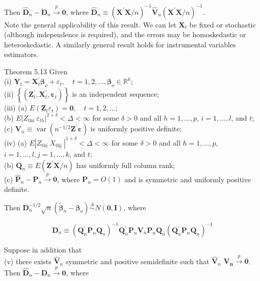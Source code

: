 \documentclass[10pt]{article}
\begin{document}
Then $\hat{\mathbf{D}}_{n}-\mathbf{D}_{n} \xrightarrow{p} \mathbf{0}$, where $\hat{\mathbf{D}}_{n} \equiv\left(\mathbf{X}^{\prime} \mathbf{X} / n\right)^{-1} \hat{\mathbf{V}}_{n}\left(\mathbf{X}^{\prime} \mathbf{X} / n\right)^{-1}$.\\
Note the general applicability of this result. We can let $\mathbf{X}_{t}$ be fixed or stochastic (although independence is required), and the errors may be homoskedastic or heteroskedastic. A similarly general result holds for instrumental variables estimators.

Theorem 5.13 Given\\
(i) $\mathbf{Y}_{t}=\mathbf{X}_{t}^{\prime} \boldsymbol{\beta}_{o}+\varepsilon_{t}, \quad t=1,2, \ldots, \boldsymbol{\beta}_{o} \in \mathbb{R}^{k}$;\\
(ii) $\left\{\left(\mathbf{Z}_{t}^{\prime}, \mathbf{X}_{t}^{\prime}, \boldsymbol{\varepsilon}_{t}\right)\right\}$ is an independent sequence;\\
(iii) (a) $E\left(\mathbf{Z}_{t} \varepsilon_{t}\right)=\mathbf{0}, \quad t=1,2, \ldots$;\\
(b) $E\left|Z_{\text {thi }} \varepsilon_{t h}\right|^{2+\delta}<\Delta<\infty$ for some $\delta>0$ and all $h=1, \ldots, p$, $i=1, \ldots, l$, and $t$;\\
(c) $\mathbf{V}_{n} \equiv \operatorname{var}\left(n^{-1 / 2} \mathbf{Z}^{\prime} \boldsymbol{\varepsilon}\right)$ is uniformly positive definite;\\
(iv) (a) $E\left|Z_{\text {thi }} X_{\text {thj }}\right|^{1+\delta}<\Delta<\infty$ for some $\delta>0$ and all $h=1, \ldots, p$, $i=1, \ldots, l, j=1, \ldots, k$, and $t$;\\
(b) $\mathbf{Q}_{n} \equiv E\left(\mathbf{Z}^{\prime} \mathbf{X} / n\right)$ has uniformly full column rank;\\
(c) $\hat{\mathbf{P}}_{n}-\mathbf{P}_{n} \xrightarrow{p} \mathbf{0}$, where $\mathbf{P}_{n}=O(1)$ and is symmetric and uniformly positive definite.

Then $\mathbf{D}_{n}^{-1 / 2} \sqrt{n}\left(\tilde{\boldsymbol{\beta}}_{n}-\boldsymbol{\beta}_{o}\right) \stackrel{A}{\sim} N(\mathbf{0}, \mathbf{I})$, where

$$
\mathbf{D}_{n} \equiv\left(\mathbf{Q}_{n}^{\prime} \mathbf{P}_{n} \mathbf{Q}_{n}\right)^{-1} \mathbf{Q}_{n}^{\prime} \mathbf{P}_{n} \mathbf{V}_{n} \mathbf{P}_{n} \mathbf{Q}_{n}\left(\mathbf{Q}_{n}^{\prime} \mathbf{P}_{n} \mathbf{Q}_{n}\right)^{-1}
$$

Suppose in addition that\\
(v) there exists $\hat{\mathbf{V}}_{n}$ symmetric and positive semidefinite such that $\hat{\mathbf{V}}_{n}$ $\mathbf{V}_{\boldsymbol{n}} \xrightarrow{p} \mathbf{0}$.\\
Then $\hat{\mathbf{D}}_{n}-\mathbf{D}_{n} \xrightarrow{p} \mathbf{0}$, where
\end{document}
